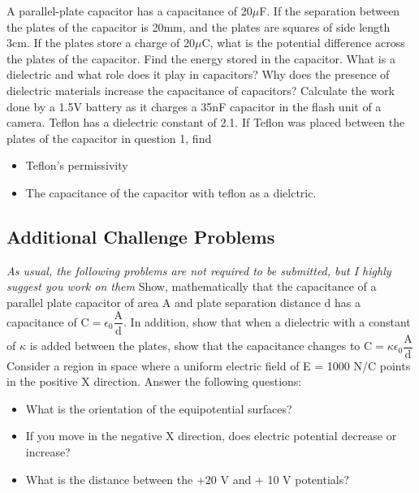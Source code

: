 \documentclass[9pt,addpoints]{exam}
\begin{document}
	\begin{questions}
		\question A parallel-plate capacitor has a capacitance of 20$\mu$F. If the separation between the plates of the capacitor is 20mm, and the plates are squares of side length 3cm. If the plates store a charge of 20$\mu$C, what is the potential difference across the plates of the capacitor. Find the energy stored in the capacitor.
		\question What is a dielectric and what role does it play in capacitors? Why does the presence of dielectric materials increase the capacitance of capacitors?
		\question Calculate the work done by a 1.5V battery as it charges a 35nF capacitor in the flash unit of a camera.
		\question Teflon has a dielectric constant of 2.1. If Teflon was placed between the plates of the capacitor in question 1, find \begin{itemize}
			\item Teflon's permissivity
			\item The capacitance of the capacitor with teflon as a dielctric. 
		\end{itemize}
		\subsection*{Additional Challenge Problems}
		\textit{As usual, the following problems are not required to be submitted, but I highly suggest you work on them} 
		\question Show, mathematically that the capacitance of a parallel plate capacitor of area A and plate separation distance d has a capacitance of $\text{C}=\epsilon_0\dfrac{\text{A}}{\text{d}}$. In addition, show that when a dielectric with a constant of $\kappa$ is added between the plates, show that the capacitance changes to $\text{C}=\kappa\epsilon_0\dfrac{\text{A}}{\text{d}}$
		\question Consider a region in space where a uniform electric field of E = 1000 N/C points in the positive X direction. Answer the following questions:\begin{itemize}
			\item What is the orientation of the equipotential surfaces?
			\item If you move in the negative X direction, does electric potential decrease or increase?
			\item What is the distance between the +20 V and + 10 V potentials?
		\end{itemize}
	\end{questions}		
\end{document}
